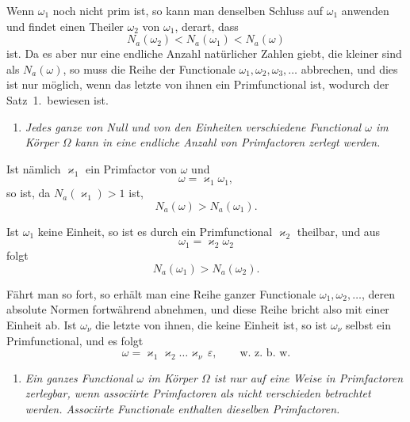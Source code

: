 \documentclass[12pt,a4paper]{article}
\theoremstyle{definition}
\begin{document}
Wenn $\omega_1$ noch nicht prim ist, so kann man denselben Schluss auf $\omega_1$ anwenden und findet einen Theiler $\omega_2$ von $\omega_1$, derart, dass
\begin{equation}\label{eq:141-3}
N_a(\omega_2) < N_a(\omega_1) < N_a(\omega)
\end{equation}
ist. Da es aber nur eine endliche Anzahl natürlicher Zahlen giebt, die kleiner sind als $N_a(\omega)$, so muss die Reihe der Functionale $\omega_1,\omega_2,\omega_3,\dots$ abbrechen, und dies ist nur möglich, wenn das letzte von ihnen ein Primfunctional ist, wodurch der Satz~1.\ bewiesen ist.

\begin{enumerate}[label=\arabic*., resume]
\item \textit{Jedes ganze von Null und von den Einheiten verschiedene Functional $\omega$ im Körper $\Omega$ kann in eine endliche Anzahl von Primfactoren zerlegt werden.}
\end{enumerate}

Ist nämlich $\varkappa_1$ ein Primfactor von $\omega$ und
\begin{equation}\label{eq:141-4}
\omega = \varkappa_1\omega_1,
\end{equation}
so ist, da $N_a(\varkappa_1)>1$ ist,
\[
N_a(\omega) > N_a(\omega_1).
\]

Ist $\omega_1$ keine Einheit, so ist es durch ein Primfunctional $\varkappa_2$ theilbar, und aus
\[
\omega_1 = \varkappa_2\omega_2
\]
folgt
\[
N_a(\omega_1) > N_a(\omega_2).
\]

Fährt man so fort, so erhält man eine Reihe ganzer Functionale $\omega_1,\omega_2,\dots$, deren absolute Normen fortwährend abnehmen, und diese Reihe bricht also mit einer Einheit ab. Ist $\omega_\nu$ die letzte von ihnen, die keine Einheit ist, so ist $\omega_\nu$ selbst ein Primfunctional, und es folgt
\begin{equation}\label{eq:141-5}
\omega = \varkappa_1\varkappa_2\dots\varkappa_\nu\,\varepsilon,
\qquad\text{w.\ z.\ b.\ w.}
\end{equation}

\newpage

\begin{enumerate}[label=\arabic*., resume]
\item \textit{Ein ganzes Functional $\omega$ im Körper $\Omega$ ist nur auf eine Weise in Primfactoren zerlegbar, wenn associirte Primfactoren als nicht verschieden betrachtet werden. Associirte Functionale enthalten dieselben Primfactoren.}
\end{enumerate}
\end{document}
